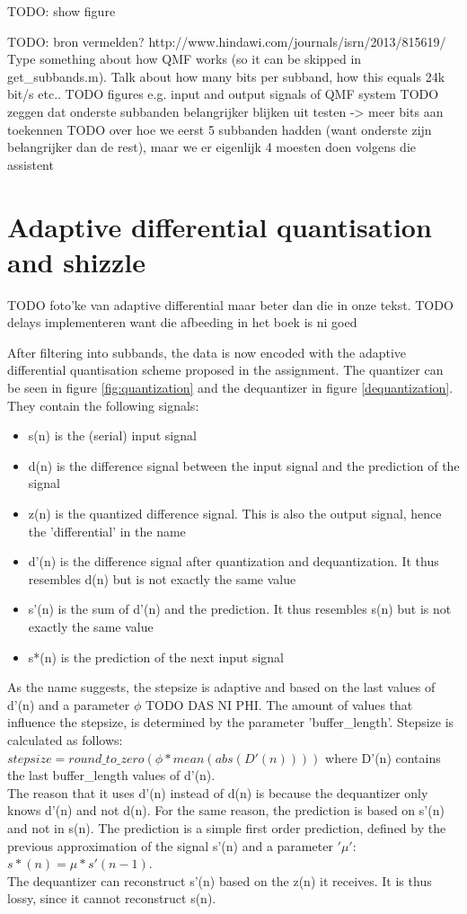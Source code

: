 \documentclass[a4paper]{article}
\begin{document}
TODO: show figure

TODO: bron vermelden? http://www.hindawi.com/journals/isrn/2013/815619/
Type something about how QMF works (so it can be skipped in get\_subbands.m). Talk about how many bits per subband, how this equals 24k bit/s etc..
TODO figures e.g. input and output signals of QMF system
TODO zeggen dat onderste subbanden belangrijker blijken uit testen -> meer bits aan toekennen
TODO over hoe we eerst 5 subbanden hadden (want onderste zijn belangrijker dan de rest), maar we er eigenlijk 4 moesten doen volgens die assistent

\section{Adaptive differential quantisation and shizzle}
TODO foto'ke van adaptive differential maar beter dan die in onze tekst.
TODO delays implementeren want die afbeeding in het boek is ni goed 

After filtering into subbands, the data is now encoded with the adaptive differential quantisation scheme proposed in the assignment. The quantizer can be seen in figure \ref{fig:quantization} and the dequantizer in figure \ref{dequantization}. They contain the following signals:

\begin{itemize}
\item s(n) is the (serial) input signal
\item d(n) is the difference signal between the input signal and the prediction of the signal
\item z(n) is the quantized difference signal. This is also the output signal, hence the 'differential' in the name
\item d'(n) is the difference signal after quantization and dequantization. It thus resembles d(n) but is not exactly the same value
\item s'(n) is the sum of d'(n) and the prediction. It thus resembles s(n) but is not exactly the same value
\item s*(n) is the prediction of the next input signal 
\end{itemize}

As the name suggests, the stepsize is adaptive and based on the last values of d'(n) and a parameter $\phi$ TODO DAS NI PHI. The amount of values that influence the stepsize, is determined by the parameter 'buffer\_length'. Stepsize is calculated as follows:\\
$stepsize = round\_to\_zero(\phi*mean(abs(D'(n))))$
where D'(n) contains the last buffer\_length values of d'(n). \\
The reason that it uses d'(n) instead of d(n) is because the dequantizer only knows d'(n) and not d(n). For the same reason, the prediction is based on s'(n) and not in s(n). The prediction is a simple first order prediction, defined by the previous approximation of the signal s'(n) and a parameter $'\mu'$:\\
$s*(n) = \mu*s'(n-1)$.\\
The dequantizer can reconstruct s'(n) based on the z(n) it receives. It is thus lossy, since it cannot reconstruct s(n).
\end{document}
